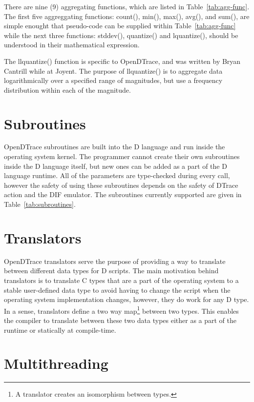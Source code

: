 There are nine (9) aggregating functions, which are listed in
Table~\ref{tab:agg-func}.  The first five aggreggating functions:
count(), min(), max(), avg(), and sum(), are simple enought that
pseudo-code can be supplied within Table~\ref{tab:agg-func} while the
next three functions: stddev(), quantize() and lquantize(), should be
understood in their mathematical expression.

The llquantize() function is specific to OpenDTrace, and was written
by Bryan Cantrill while at Joyent.  The purpose of llquantize() is to
aggregate data logarithmically over a specified range of magnitudes,
but use a frequency distribution within each of the magnitude.

\section{Subroutines}
\label{sec:subroutines}

OpenDTrace subroutines are built into the D language and run inside the
operating system kernel. The programmer cannot create their own subroutines
inside the D language itself, but new ones can be added as a part of the D
language runtime. All of the parameters are type-checked during every call,
however the safety of using these subroutines depends on the safety of DTrace
action and the DIF emulator. The subroutines currently supported are given
in Table~\ref{tab:subroutines}.

\section{Translators}
\label{sec:translators}

OpenDTrace translators serve the purpose of providing a way to translate between
different data types for D scripts. The main motivation behind translators is to
translate C types that are a part of the operating system to a stable user-defined
data type to avoid having to change the script when the operating system implementation
changes, however, they do work for any D type. In a sense, translators define a two way
map\footnote{A translator creates an isomorphism between types.} between two types.
This enables the compiler to translate between these two data types either as a part of
the runtime or statically at compile-time.

\section{Multithreading}

